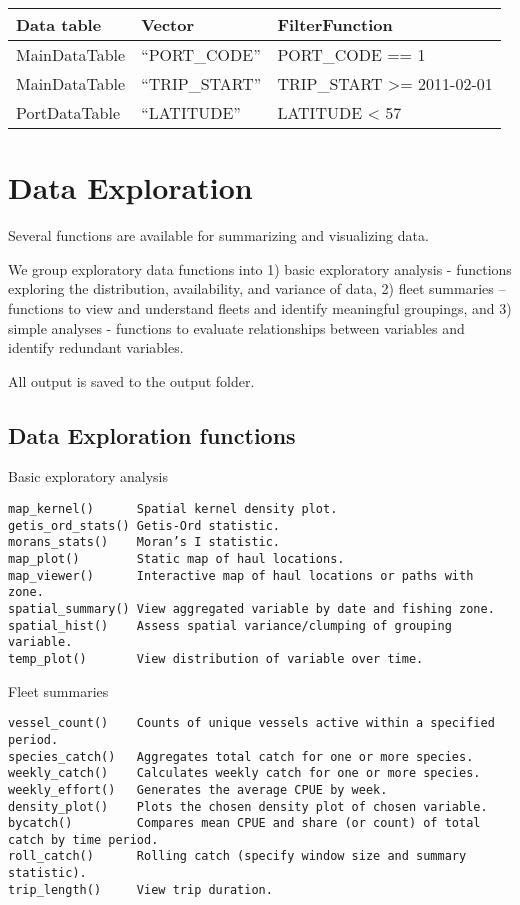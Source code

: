 \documentclass[
]{article}
\begin{document}
\begin{longtable}[]{@{}lll@{}}
\toprule
Data table & Vector & FilterFunction\tabularnewline
\midrule
\endhead
MainDataTable & ``PORT\_CODE'' & PORT\_CODE == 1\tabularnewline
MainDataTable & ``TRIP\_START'' & TRIP\_START \textgreater= 2011-02-01\tabularnewline
PortDataTable & ``LATITUDE'' & LATITUDE \textless{} 57\tabularnewline
\bottomrule
\end{longtable}

\hypertarget{data-exploration}{%
\section{Data Exploration}\label{data-exploration}}

Several functions are available for summarizing and visualizing data.

We group exploratory data functions into 1) basic exploratory analysis - functions exploring the distribution, availability, and variance of data, 2) fleet summaries -- functions to view and understand fleets and identify meaningful groupings, and 3) simple analyses - functions to evaluate relationships between variables and identify redundant variables.

All output is saved to the output folder.

\hypertarget{data-exploration-functions}{%
\subsection{Data Exploration functions}\label{data-exploration-functions}}

Basic exploratory analysis

\begin{verbatim}
map_kernel()      Spatial kernel density plot.  
getis_ord_stats() Getis-Ord statistic.  
morans_stats()    Moran’s I statistic.  
map_plot()        Static map of haul locations. 
map_viewer()      Interactive map of haul locations or paths with zone. 
spatial_summary() View aggregated variable by date and fishing zone.    
spatial_hist()    Assess spatial variance/clumping of grouping variable.    
temp_plot()       View distribution of variable over time.  
\end{verbatim}

Fleet summaries

\begin{verbatim}
vessel_count()    Counts of unique vessels active within a specified period.
species_catch()   Aggregates total catch for one or more species. 
weekly_catch()    Calculates weekly catch for one or more species.
weekly_effort()   Generates the average CPUE by week. 
density_plot()    Plots the chosen density plot of chosen variable.
bycatch()         Compares mean CPUE and share (or count) of total catch by time period.
roll_catch()      Rolling catch (specify window size and summary statistic).    
trip_length()     View trip duration.   
\end{verbatim}
\end{document}
